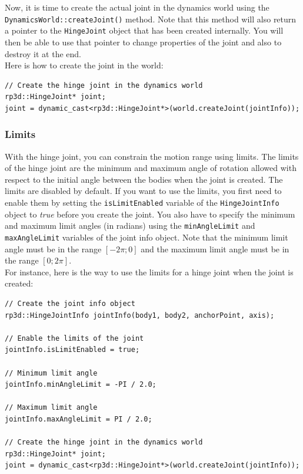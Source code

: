 \documentclass[a4paper,12pt]{article}
\begin{document}
    \vspace{0.6cm}

    Now, it is time to create the actual joint in the dynamics world using the \texttt{Dynamics\allowbreak World::createJoint()} method.
    Note that this method will also return a pointer to the \texttt{HingeJoint} object that has been created internally. You will then
    be able to use that pointer to change properties of the joint and also to destroy it at the end. \\

    Here is how to create the joint in the world: \\

    \begin{lstlisting}
// Create the hinge joint in the dynamics world
rp3d::HingeJoint* joint;
joint = dynamic_cast<rp3d::HingeJoint*>(world.createJoint(jointInfo));
  \end{lstlisting}

     \subsubsection{Limits}

     With the hinge joint, you can constrain the motion range using limits. The limits of the hinge joint are the minimum and maximum angle of rotation allowed with respect to the initial
     angle between the bodies when the joint is created. The limits are disabled by default. If you want to use the limits, you first need to enable them by setting the
     \texttt{isLimitEnabled} variable of the \texttt{HingeJointInfo} object to \emph{true} before you create the joint. You also have to specify the minimum and maximum limit
     angles (in radians) using the \texttt{minAngleLimit} and \texttt{maxAngleLimit} variables of the joint info object. Note that the minimum limit angle must be in the
     range $[ -2 \pi; 0 ]$ and the maximum limit angle must be in the range $[ 0; 2 \pi ]$. \\

     For instance, here is the way to use the limits for a hinge joint when the joint is created: \\

     \begin{lstlisting}
// Create the joint info object
rp3d::HingeJointInfo jointInfo(body1, body2, anchorPoint, axis);

// Enable the limits of the joint
jointInfo.isLimitEnabled = true;

// Minimum limit angle
jointInfo.minAngleLimit = -PI / 2.0;

// Maximum limit angle
jointInfo.maxAngleLimit = PI / 2.0;

// Create the hinge joint in the dynamics world
rp3d::HingeJoint* joint;
joint = dynamic_cast<rp3d::HingeJoint*>(world.createJoint(jointInfo));
  \end{lstlisting}
\end{document}
